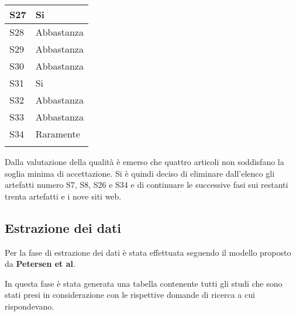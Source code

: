\begin{table}[h]
{\begin{tabular}{|l|l|}
		S27                & Si         \\ \hline
		S28                & Abbastanza \\ \hline
		S29                & Abbastanza \\ \hline
		S30                & Abbastanza \\ \hline
		S31                & Si         \\ \hline
		S32                & Abbastanza \\ \hline
		S33                & Abbastanza \\ \hline
		\rowcolor[HTML]{FD6864} 
		S34                & Raramente  \\ \hline
		\rowcolor[HTML]{FD6864} 
	\end{tabular} }
\end{table}

Dalla valutazione della qualità è emerso che quattro articoli non soddisfano la soglia minima di accettazione. Si è quindi deciso di eliminare dall’elenco gli artefatti numero S7, S8, S26 e S34 e di continuare le successive fasi sui restanti trenta artefatti e i nove siti web.
\subsection{Estrazione dei dati}
Per la fase di estrazione dei dati è stata effettuata seguendo il modello proposto da \textbf{Petersen et al}.

In questa fase è stata generata una tabella contenente tutti gli studi che sono stati presi in considerazione con le rispettive domande di ricerca a cui rispondevano.

